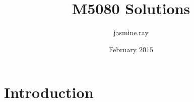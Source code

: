 \documentclass{article}
\title{M5080 Solutions}
\author{jasmine.ray }
\date{February 2015}
\begin{document}
\maketitle

\section{Introduction}
\end{document}
